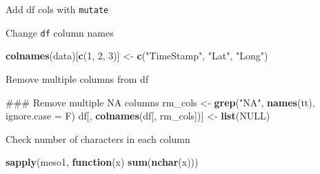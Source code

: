 \documentclass[10,portrait]{article}
\newenvironment{Shaded}{\begin{snugshade}}{\end{snugshade}}
\newcommand{\KeywordTok}[1]{\textcolor[rgb]{0.13,0.29,0.53}{\textbf{#1}}}
\newcommand{\DataTypeTok}[1]{\textcolor[rgb]{0.13,0.29,0.53}{#1}}
\newcommand{\DecValTok}[1]{\textcolor[rgb]{0.00,0.00,0.81}{#1}}
\newcommand{\StringTok}[1]{\textcolor[rgb]{0.31,0.60,0.02}{#1}}
\newcommand{\OtherTok}[1]{\textcolor[rgb]{0.56,0.35,0.01}{#1}}
\newcommand{\ControlFlowTok}[1]{\textcolor[rgb]{0.13,0.29,0.53}{\textbf{#1}}}
\newcommand{\OperatorTok}[1]{\textcolor[rgb]{0.81,0.36,0.00}{\textbf{#1}}}
\newcommand{\NormalTok}[1]{#1}
\begin{document}
Add df cols with \texttt{mutate}

\begin{Shaded}
\end{Shaded}

Change \texttt{df} column names

\begin{Shaded}
\begin{Highlighting}[]
\KeywordTok{colnames}\NormalTok{(data)[}\KeywordTok{c}\NormalTok{(}\DecValTok{1}\NormalTok{, }\DecValTok{2}\NormalTok{, }\DecValTok{3}\NormalTok{)] <-}\StringTok{ }\KeywordTok{c}\NormalTok{(}\StringTok{"TimeStamp"}\NormalTok{, }\StringTok{"Lat"}\NormalTok{, }
    \StringTok{"Long"}\NormalTok{)}
\end{Highlighting}
\end{Shaded}

Remove multiple columns from df

\begin{Shaded}
\begin{Highlighting}[]
\NormalTok{### Remove multiple NA columns}
\NormalTok{rm_cols <-}\StringTok{ }\KeywordTok{grep}\NormalTok{(}\StringTok{"NA"}\NormalTok{, }\KeywordTok{names}\NormalTok{(tt), }\DataTypeTok{ignore.case =}\NormalTok{ F)}
\NormalTok{df[, }\KeywordTok{colnames}\NormalTok{(df[, rm_cols])] <-}\StringTok{ }\KeywordTok{list}\NormalTok{(}\OtherTok{NULL}\NormalTok{)}
\end{Highlighting}
\end{Shaded}

Check number of characters in each column

\begin{Shaded}
\begin{Highlighting}[]
\KeywordTok{sapply}\NormalTok{(meso1, }\ControlFlowTok{function}\NormalTok{(x) }\KeywordTok{sum}\NormalTok{(}\KeywordTok{nchar}\NormalTok{(x)))}
\end{Highlighting}
\end{Shaded}
\end{document}
